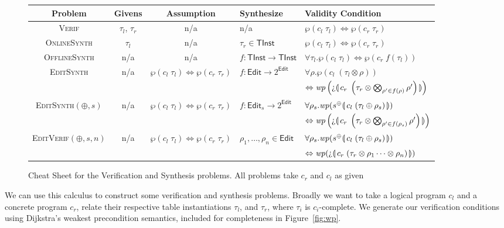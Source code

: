 \begin{figure*}
  \begin{tabular}{c c c l l}
    \toprule
    Problem
    & Givens
    & Assumption
    & Synthesize
    & Validity Condition \\ \midrule
    \textsc{Verif}
    & $\tau_l$, $\tau_r$
    & n/a
    & n/a
    & $\wp(c_l\; \tau_l) \Leftrightarrow \wp(c_r\; \tau_r)$ \\
    \textsc{OnlineSynth}
    & $\tau_l$
    & n/a
    & $\tau_r \in \mathsf{TInst}$
    & $\wp(c_l\; \tau_l) \Leftrightarrow \wp(c_r\; \tau_r)$ \\
    \textsc{OfflineSynth}
    & n/a
    & n/a
    & $f : \mathsf{TInst} \to \mathsf{TInst}$
    & $\forall \tau_l. \wp(c_l\; \tau_l) \Leftrightarrow \wp(c_r\; f(\tau_l))$ \\
    \textsc{EditSynth}
    & n/a
    & $\wp(c_l\; \tau_l) \Leftrightarrow \wp(c_r\; \tau_r)$
    & $f : \mathsf{Edit} \to 2^{\mathsf{Edit}}$
    & $\forall \rho. \wp(c_l\; (\tau_l \otimes \rho))$ \\
    &&&&\qquad $\Leftrightarrow \wp\left(\hole\parenbb{c_r\; \left(\tau_r\otimes \bigotimes_{\rho' \in f(\rho)} \rho'\right)}\right)$ \\
    \textsc{EditSynth}$(\oplus, s)$
    & n/a
    & $\wp(c_l\; \tau_l) \Leftrightarrow \wp(c_r\; \tau_r)$
    & $f : \mathsf{Edit}_s \to 2^{\mathsf{Edit}}$
    & $\forall \rho_{s}. \mathit{wp}(s^\oplus\llparenthesis\, c_l\; (\tau_l \oplus \rho_s)\, \rrparenthesis)$ \\
    &&&&\qquad$\Leftrightarrow \wp\left(\hole\parenbb{c_r\;\left(\tau_r\otimes \bigotimes_{\rho' \in f(\rho_{s})} \rho'\right)}\right)$ \\
    \textsc{EditVerif}$(\oplus, s, n)$
    & n/a
    & $\wp(c_l\; \tau_l) \Leftrightarrow \wp(c_r\; \tau_r)$
    & $\rho_1, \ldots, \rho_n \in \mathsf{Edit}$
    & $\forall \rho_s. \mathit{wp}(s^\oplus\llparenthesis\, c_l\; (\tau_l \oplus \rho_s)\, \rrparenthesis)$\\
    &&&&$\Leftrightarrow \wp(\hole\parenbb{c_r\; (\tau_r \otimes \rho_1 \cdots \otimes \rho_n)})$ \\
    \bottomrule
  \end{tabular}
  \caption{Cheat Sheet for the Verification and Synthesis
    problems. All problems take $c_r$ and $c_l$ as given}
\end{figure*}

We can use this calculus to construct some verification and synthesis
problems. Broadly we want to take a logical program $c_l$ and a concrete program
$c_r$, relate their respective table instantiations $\tau_l$, and $\tau_r$,
where $\tau_i$ is $c_i$-complete.  We generate our verification conditions using
Dijkstra's weakest precondition semantics, included for completeness in
Figure~\ref{fig:wp}.

